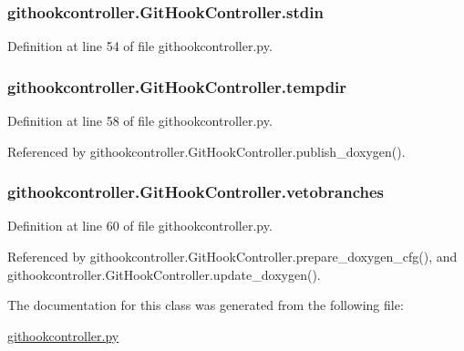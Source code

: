 \subsubsection[{stdin}]{\setlength{\rightskip}{0pt plus 5cm}githookcontroller.\-Git\-Hook\-Controller.\-stdin}\label{classgithookcontroller_1_1GitHookController_a2979702282896092040b9e3adff073e5}


Definition at line 54 of file githookcontroller.\-py.

\subsubsection[{tempdir}]{\setlength{\rightskip}{0pt plus 5cm}githookcontroller.\-Git\-Hook\-Controller.\-tempdir}\label{classgithookcontroller_1_1GitHookController_a8ba9332f051b62f8be656967a1607b16}


Definition at line 58 of file githookcontroller.\-py.



Referenced by githookcontroller.\-Git\-Hook\-Controller.\-publish\-\_\-doxygen().

\subsubsection[{vetobranches}]{\setlength{\rightskip}{0pt plus 5cm}githookcontroller.\-Git\-Hook\-Controller.\-vetobranches}\label{classgithookcontroller_1_1GitHookController_aef6dc3b539aa239e80317038abe866aa}


Definition at line 60 of file githookcontroller.\-py.



Referenced by githookcontroller.\-Git\-Hook\-Controller.\-prepare\-\_\-doxygen\-\_\-cfg(), and githookcontroller.\-Git\-Hook\-Controller.\-update\-\_\-doxygen().



The documentation for this class was generated from the following file\-:\begin{DoxyCompactItemize}
\item 
\hyperlink{githookcontroller_8py}{githookcontroller.\-py}\end{DoxyCompactItemize}
